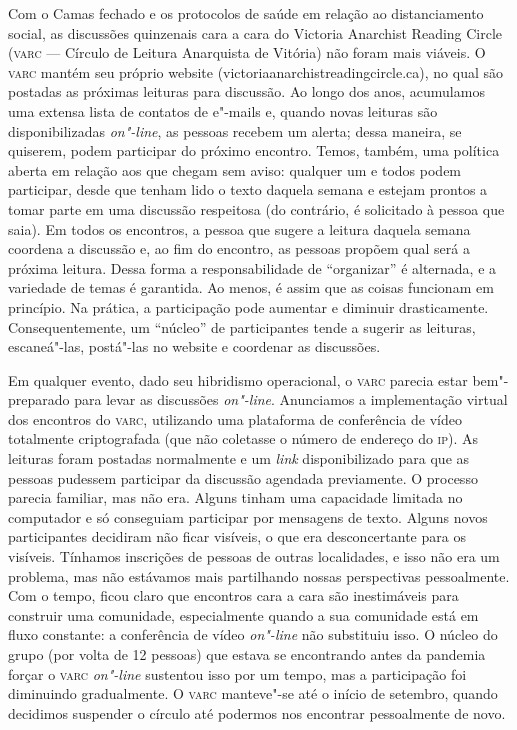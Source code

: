 Com o Camas fechado e os protocolos de saúde em relação ao
distanciamento social, as discussões quinzenais cara a cara do Victoria
Anarchist Reading Circle (\textsc{varc} --- Círculo de Leitura Anarquista de
Vitória) não foram mais viáveis. O \textsc{varc} mantém seu próprio website
(victoriaanarchistreadingcircle.ca), no qual são postadas as próximas
leituras para discussão. Ao longo dos anos, acumulamos uma extensa lista
de contatos de e"-mails e, quando novas leituras são disponibilizadas
\emph{on"-line}, as pessoas recebem um alerta; dessa maneira, se
quiserem, podem participar do próximo encontro. Temos, também, uma
política aberta em relação aos que chegam sem aviso: qualquer um e todos
podem participar, desde que tenham lido o texto daquela semana e estejam
prontos a tomar parte em uma discussão respeitosa (do contrário, é
solicitado à pessoa que saia). Em todos os encontros, a pessoa que
sugere a leitura daquela semana coordena a discussão e, ao fim do
encontro, as pessoas propõem qual será a próxima leitura. Dessa forma a
responsabilidade de ``organizar'' é alternada, e a variedade de temas é
garantida. Ao menos, é assim que as coisas funcionam em princípio. Na
prática, a participação pode aumentar e diminuir drasticamente.
Consequentemente, um ``núcleo'' de participantes tende a sugerir as
leituras, escaneá"-las, postá"-las no website e coordenar as discussões.

Em qualquer evento, dado seu hibridismo operacional, o \textsc{varc} parecia
estar bem"-preparado para levar as discussões \emph{on"-line}. Anunciamos
a implementação virtual dos encontros do \textsc{varc}, utilizando uma plataforma
de conferência de vídeo totalmente criptografada (que não coletasse o
número de endereço do \textsc{ip}). As leituras foram postadas normalmente e um
\emph{link} disponibilizado para que as pessoas pudessem participar da
discussão agendada previamente. O processo parecia familiar, mas não
era. Alguns tinham uma capacidade limitada no computador e só conseguiam
participar por mensagens de texto. Alguns novos participantes decidiram
não ficar visíveis, o que era desconcertante para os visíveis. Tínhamos
inscrições de pessoas de outras localidades, e isso não era um problema,
mas não estávamos mais partilhando nossas perspectivas pessoalmente. Com
o tempo, ficou claro que encontros cara a cara são inestimáveis para
construir uma comunidade, especialmente quando a sua comunidade está em
fluxo constante: a conferência de vídeo \emph{on"-line} não substituiu
isso. O núcleo do grupo (por volta de 12 pessoas) que estava se
encontrando antes da pandemia forçar o \textsc{varc} \emph{on"-line} sustentou
isso por um tempo, mas a participação foi diminuindo gradualmente. O
\textsc{varc} manteve"-se até o início de setembro, quando decidimos suspender o
círculo até podermos nos encontrar pessoalmente de novo.


